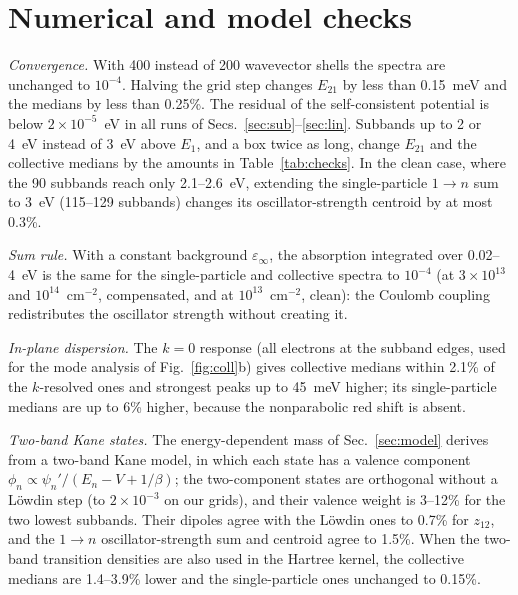 \documentclass[11pt]{article}
\begin{document}
\appendix
\section{Numerical and model checks}\label{app:checks}
\emph{Convergence.} With 400 instead of 200 wavevector shells the spectra are unchanged to $10^{-4}$. Halving the grid step changes $E_{21}$ by less than 0.15~meV and the medians by less than 0.25\%. The residual of the self-consistent potential is below $2\times10^{-5}$~eV in all runs of Secs.~\ref{sec:sub}--\ref{sec:lin}. Subbands up to 2 or 4~eV instead of 3~eV above $E_1$, and a box twice as long, change $E_{21}$ and the collective medians by the amounts in Table~\ref{tab:checks}. In the clean case, where the 90 subbands reach only 2.1--2.6~eV, extending the single-particle $1\to n$ sum to 3~eV (115--129 subbands) changes its oscillator-strength centroid by at most 0.3\%.

\emph{Sum rule.} With a constant background $\varepsilon_\infty$, the absorption integrated over 0.02--4~eV is the same for the single-particle and collective spectra to $10^{-4}$ (at $3\times10^{13}$ and $10^{14}$~cm$^{-2}$, compensated, and at $10^{13}$~cm$^{-2}$, clean): the Coulomb coupling redistributes the oscillator strength without creating it.

\emph{In-plane dispersion.} The $k=0$ response (all electrons at the subband edges, used for the mode analysis of Fig.~\ref{fig:coll}b) gives collective medians within 2.1\% of the $k$-resolved ones and strongest peaks up to 45~meV higher; its single-particle medians are up to 6\% higher, because the nonparabolic red shift is absent.

\emph{Two-band Kane states.} The energy-dependent mass of Sec.~\ref{sec:model} derives from a two-band Kane model, in which each state has a valence component $\phi_n\propto\psi_n'/(E_n-V+1/\beta)$; the two-component states are orthogonal without a L\"owdin step (to $2\times10^{-3}$ on our grids), and their valence weight is 3--12\% for the two lowest subbands. Their dipoles agree with the L\"owdin ones to 0.7\% for $z_{12}$, and the $1\to n$ oscillator-strength sum and centroid agree to 1.5\%. When the two-band transition densities are also used in the Hartree kernel, the collective medians are 1.4--3.9\% lower and the single-particle ones unchanged to 0.15\%.
\end{document}

